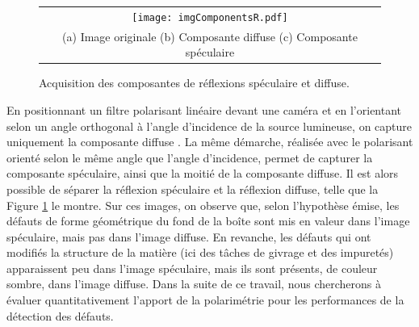 
\begin{figure}[bhtp]
	\begin{center}
		\begin{tabular}{c}
			\texttt{[image: imgComponentsR.pdf]}
			\\
			(a) Image originale \hspace{1.4cm} (b) Composante diffuse \hspace{1.4cm} (c) Composante spéculaire
		\end{tabular}
	\end{center}
	\caption{Acquisition des composantes de réflexions spéculaire et diffuse.}
	\label{fig:specular_diffuse}
\end{figure}
En positionnant un filtre polarisant linéaire devant une caméra et en l'orientant selon un angle orthogonal à l'angle d'incidence de la source lumineuse, on capture uniquement la composante diffuse \cite{debevec_acquiring_2000}.
La même démarche, réalisée avec le polarisant orienté selon le même angle que l'angle d'incidence, permet de capturer la composante spéculaire, ainsi que la moitié de la composante diffuse.
Il est alors possible de séparer la réflexion spéculaire et la réflexion diffuse, telle que la Figure \ref{fig:specular_diffuse} le montre.
Sur ces images, on observe que, selon l'hypothèse émise, les défauts de forme géométrique du fond de la boîte sont mis en valeur dans l'image spéculaire, mais pas dans l'image diffuse.
En revanche, les défauts qui ont modifiés la structure de la matière (ici des tâches de givrage et des impuretés) apparaissent peu dans l'image spéculaire, mais ils sont présents, de couleur sombre, dans l'image diffuse.
Dans la suite de ce travail, nous chercherons à évaluer quantitativement l'apport de la polarimétrie pour les performances de la détection des défauts.

